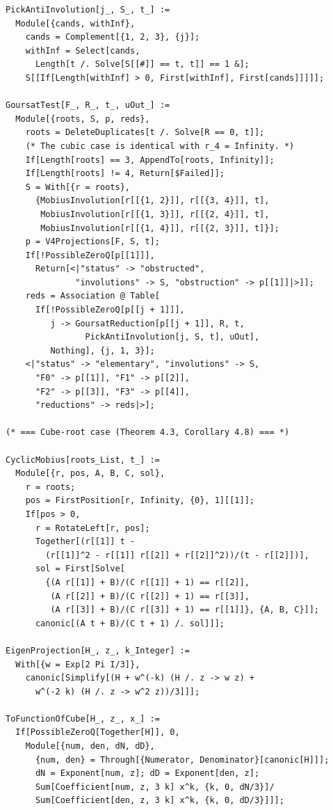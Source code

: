 \documentclass[11pt,a4paper]{article}
\theoremstyle{plain}
\theoremstyle{definition}
\theoremstyle{remark}
\begin{document}
\begin{lstlisting}
PickAntiInvolution[j_, S_, t_] :=
  Module[{cands, withInf},
    cands = Complement[{1, 2, 3}, {j}];
    withInf = Select[cands,
      Length[t /. Solve[S[[#]] == t, t]] == 1 &];
    S[[If[Length[withInf] > 0, First[withInf], First[cands]]]]];

GoursatTest[F_, R_, t_, uOut_] :=
  Module[{roots, S, p, reds},
    roots = DeleteDuplicates[t /. Solve[R == 0, t]];
    (* The cubic case is identical with r_4 = Infinity. *)
    If[Length[roots] == 3, AppendTo[roots, Infinity]];
    If[Length[roots] != 4, Return[$Failed]];
    S = With[{r = roots},
      {MobiusInvolution[r[[{1, 2}]], r[[{3, 4}]], t],
       MobiusInvolution[r[[{1, 3}]], r[[{2, 4}]], t],
       MobiusInvolution[r[[{1, 4}]], r[[{2, 3}]], t]}];
    p = V4Projections[F, S, t];
    If[!PossibleZeroQ[p[[1]]],
      Return[<|"status" -> "obstructed",
              "involutions" -> S, "obstruction" -> p[[1]]|>]];
    reds = Association @ Table[
      If[!PossibleZeroQ[p[[j + 1]]],
         j -> GoursatReduction[p[[j + 1]], R, t,
                PickAntiInvolution[j, S, t], uOut],
         Nothing], {j, 1, 3}];
    <|"status" -> "elementary", "involutions" -> S,
      "F0" -> p[[1]], "F1" -> p[[2]],
      "F2" -> p[[3]], "F3" -> p[[4]],
      "reductions" -> reds|>];

(* === Cube-root case (Theorem 4.3, Corollary 4.8) === *)

CyclicMobius[roots_List, t_] :=
  Module[{r, pos, A, B, C, sol},
    r = roots;
    pos = FirstPosition[r, Infinity, {0}, 1][[1]];
    If[pos > 0,
      r = RotateLeft[r, pos];
      Together[(r[[1]] t -
        (r[[1]]^2 - r[[1]] r[[2]] + r[[2]]^2))/(t - r[[2]])],
      sol = First[Solve[
        {(A r[[1]] + B)/(C r[[1]] + 1) == r[[2]],
         (A r[[2]] + B)/(C r[[2]] + 1) == r[[3]],
         (A r[[3]] + B)/(C r[[3]] + 1) == r[[1]]}, {A, B, C}]];
      canonic[(A t + B)/(C t + 1) /. sol]]];

EigenProjection[H_, z_, k_Integer] :=
  With[{w = Exp[2 Pi I/3]},
    canonic[Simplify[(H + w^(-k) (H /. z -> w z) +
      w^(-2 k) (H /. z -> w^2 z))/3]]];

ToFunctionOfCube[H_, z_, x_] :=
  If[PossibleZeroQ[Together[H]], 0,
    Module[{num, den, dN, dD},
      {num, den} = Through[{Numerator, Denominator}[canonic[H]]];
      dN = Exponent[num, z]; dD = Exponent[den, z];
      Sum[Coefficient[num, z, 3 k] x^k, {k, 0, dN/3}]/
      Sum[Coefficient[den, z, 3 k] x^k, {k, 0, dD/3}]]];


\end{lstlisting}
\end{document}
